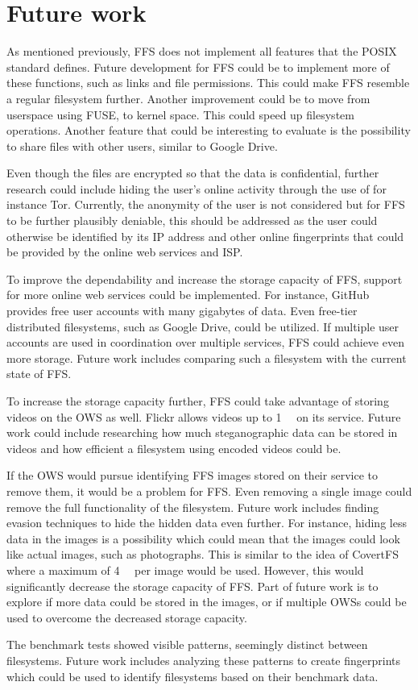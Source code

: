 
\section{Future work}
\label{sec:futureWork}
As mentioned previously, \gls{FFS} does not implement all features that the POSIX standard defines. Future development for \gls{FFS} could be to implement more of these functions, such as links and file permissions. This could make \gls{FFS} resemble a regular filesystem further. Another improvement could be to move from userspace using \gls{FUSE}, to kernel space. This could speed up filesystem operations. Another feature that could be interesting to evaluate is the possibility to share files with other users, similar to Google Drive.

Even though the files are encrypted so that the data is confidential, further research could include hiding the user's online activity through the use of for instance Tor. Currently, the anonymity of the user is not considered but for \gls{FFS} to be further plausibly deniable, this should be addressed as the user could otherwise be identified by its IP address and other online fingerprints that could be provided by the online web services and \gls{ISP}.

To improve the dependability and increase the storage capacity of \gls{FFS}, support for more online web services could be implemented. For instance, GitHub provides free user accounts with many gigabytes of data. Even \mbox{free-tier} distributed filesystems, such as Google Drive, could be utilized. If multiple user accounts are used in coordination over multiple services, \gls{FFS} could achieve even more storage. Future work includes comparing such a filesystem with the current state of \gls{FFS}.

To increase the storage capacity further, \gls{FFS} could take advantage of storing videos on the \gls{OWS} as well. Flickr allows videos up to \SI[per-mode = symbol]{1}{\giga\byte} on its service. Future work could include researching how much steganographic data can be stored in videos and how efficient a filesystem using encoded videos could be.

If the \gls{OWS} would pursue identifying \gls{FFS} images stored on their service to remove them, it would be a problem for \gls{FFS}. Even removing a single image could remove the full functionality of the filesystem. Future work includes finding evasion techniques to hide the hidden data even further. For instance, hiding less data in the images is a possibility which could mean that the images could look like actual images, such as photographs. This is similar to the idea of CovertFS\,\cite{baliga2007web} where a maximum of \SI[per-mode = symbol]{4}{\kilo\byte} per image would be used. However, this would significantly decrease the storage capacity of \gls{FFS}. Part of future work is to explore if more data could be stored in the images, or if multiple \gls{OWS}s could be used to overcome the decreased storage capacity. 

The benchmark tests showed visible patterns, seemingly distinct between filesystems. Future work includes analyzing these patterns to create fingerprints which could be used to identify filesystems based on their benchmark data.
